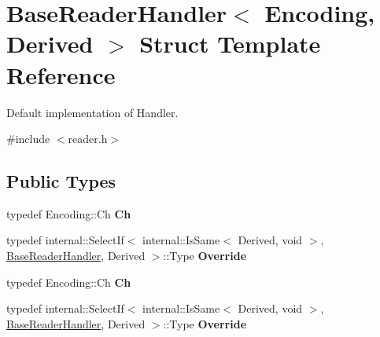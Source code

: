 \hypertarget{structBaseReaderHandler}{}\section{Base\+Reader\+Handler$<$ Encoding, Derived $>$ Struct Template Reference}
\label{structBaseReaderHandler}


Default implementation of Handler.  




{\ttfamily \#include $<$reader.\+h$>$}

\subsection*{Public Types}
\begin{DoxyCompactItemize}
\item 
\mbox{\label{structBaseReaderHandler_a8302c755dd3560c8c5bac99162c28214}} 
typedef Encoding\+::\+Ch {\bfseries Ch}
\item 
\mbox{\label{structBaseReaderHandler_a7b6c70d9bf7483b2de5d249f1593776a}} 
typedef internal\+::\+Select\+If$<$ internal\+::\+Is\+Same$<$ Derived, void $>$, \hyperlink{structBaseReaderHandler}{Base\+Reader\+Handler}, Derived $>$\+::Type {\bfseries Override}
\item 
\mbox{\label{structBaseReaderHandler_a8302c755dd3560c8c5bac99162c28214}} 
typedef Encoding\+::\+Ch {\bfseries Ch}
\item 
\mbox{\label{structBaseReaderHandler_a7b6c70d9bf7483b2de5d249f1593776a}} 
typedef internal\+::\+Select\+If$<$ internal\+::\+Is\+Same$<$ Derived, void $>$, \hyperlink{structBaseReaderHandler}{Base\+Reader\+Handler}, Derived $>$\+::Type {\bfseries Override}
\end{DoxyCompactItemize}
